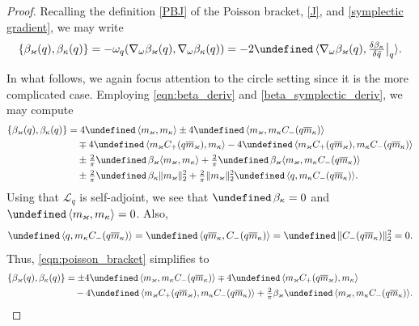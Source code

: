 \documentclass{amsart}
\numberwithin{equation}{section}
\theoremstyle{definition}
\newcommand{\dl}{\delta}
\newcommand{\om}{\omega}
\newcommand{\ka}{\kappa}
\newcommand{\vk}{\varkappa}
\newcommand{\Lc}{\mathcal{L}}
\newcommand{\na}{\nabla}
\newcommand{\lan}{\langle}
\newcommand{\ran}{\rangle}
\let\Re=\undefined\DeclareMathOperator{\Re}{Re}
\let\Im=\undefined\DeclareMathOperator{\Im}{Im}
\begin{document}
\begin{proof}
Recalling the definition \eqref{PBJ} of the Poisson bracket, \eqref{J}, and \eqref{symplectic gradient}, we may write
$$
\{\beta_\vk(q),\beta_\ka(q)\}=-\om_q(\na_\om \beta_\vk(q),\na_\om \beta_\ka(q))=- 2\Re\, \lan \na_\om \beta_\vk(q),\tfrac{\dl \beta_\ka}{\dl \bar{q}}\bigr|_q\ran.
$$

In what follows, we again focus attention to the circle setting since it is the more complicated case.  Employing \eqref{eqn:beta_deriv} and \eqref{beta_symplectic_deriv}, we may compute
\begin{align}
\{\beta_\vk(q),\beta_\ka(q)\}&=4\Im\,\lan m_\vk,m_\ka\ran \pm 4\Im\,\lan m_\vk, m_\ka C_-(q\overline m_\ka)\ran\nonumber\\
&\quad\mp 4\Im\,\lan m_\vk C_+(q\overline{m}_\vk),m_\ka\ran-4\Im\,\lan m_\vk C_+(q\overline{m}_\vk),m_\ka C_-(q\overline m_\ka)\ran \nonumber\\
&\quad\pm\tfrac{2}{\pi}\Im\,\beta_\vk\lan m_\vk,m_\ka\ran+\tfrac{2}{\pi}\Im\,\beta_\vk\lan m_\vk,m_\ka C_-(q\overline{m}_\ka)\ran \nonumber\\
&\quad\pm\tfrac{2}{\pi} \Im\, \beta_\ka\| m_\vk\|_{2}^2+\tfrac{2}{\pi}\| m_\vk\|_{2}^2\Im\, \lan q, m_\ka  C_-(q\overline{m}_\ka)\ran. \label{eqn:poisson_bracket}
\end{align}
Using that $\Lc_q$ is self-adjoint, we see that $\Im\, \beta_\ka=0$ and $\Im\,\lan m_\vk,m_\ka\ran=0$.  Also,
$$
\Im\, \lan q, m_\ka  C_-(q\overline{m}_\ka)\ran = \Im\, \lan q\overline{m}_\ka, C_-(q\overline{m}_\ka)\ran =\Im\,\|C_-(q\overline{m}_\ka)\|_2^2=0.
$$
Thus, \eqref{eqn:poisson_bracket} simplifies to
\begin{align}
\{\beta_\vk(q),\beta_\ka(q)\}&= \pm 4\Im\,\lan m_\vk, m_\ka C_-(q\overline m_\ka)\ran\mp 4\Im\,\lan m_\vk C_+(q\overline{m}_\vk),m_\ka\ran\nonumber\\
&\quad-4\Im\,\lan m_\vk C_+(q\overline{m}_\vk),m_\ka C_-(q\overline m_\ka)\ran+\tfrac{2}{\pi}\beta_\vk\Im\,\lan m_\vk,m_\ka C_-(q\overline{m}_\ka)\ran. \label{eqn:poisson_bracket'}
\end{align}


\end{proof}
\end{document}
